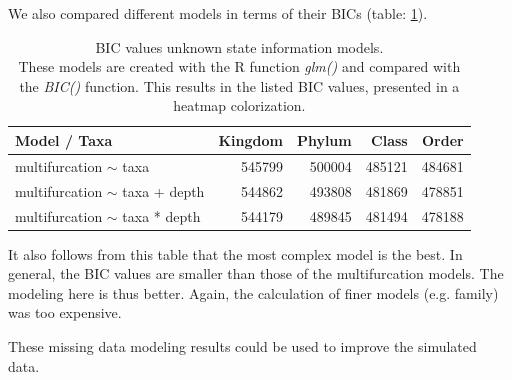       We also compared different models in terms of their BICs (table: \ref{table:BIC unknown information}). \\ 
      \begin{table}[h!]
        \begin{center}
          \begin{tabular}{ |l|r|r|r|r| }
            \hline
            \bfseries Model / Taxa & \bfseries Kingdom & \bfseries Phylum & \bfseries Class & \bfseries Order \\
            \hline \hline
            multifurcation $\sim$ taxa & {\cellcolor{green!15}}545799 & {\cellcolor{green!35}}500004 & {\cellcolor{green!45}}485121 & {\cellcolor{green!45}}484681 \\
            \hline
            multifurcation $\sim$ taxa + depth & {\cellcolor{green!15}}544862 & {\cellcolor{green!40}}493808 & {\cellcolor{green!45}}481869 & {\cellcolor{green!50}}478851 \\
            \hline
            multifurcation $\sim$ taxa * depth & {\cellcolor{green!15}}544179 & {\cellcolor{green!45}}489845 & {\cellcolor{green!45}}481494 & {\cellcolor{green!50}}478188 \\
            \hline
          \end{tabular} 
        \end{center}
        \caption{BIC values unknown state information models. \\
          These models are created with the R function \textit{glm()} and compared with the 
            \textit{BIC()} function. This results in the listed BIC values, presented in a heatmap colorization.}
        \label{table:BIC unknown information} 
      \end{table}

      It also follows from this table that the most complex model is the best. In general, the BIC 
        values are smaller than those of the multifurcation models. The modeling here is thus better.
        Again, the calculation of finer models (e.g. family) was too expensive.

      These missing data modeling results could be used to improve the simulated data. \\

